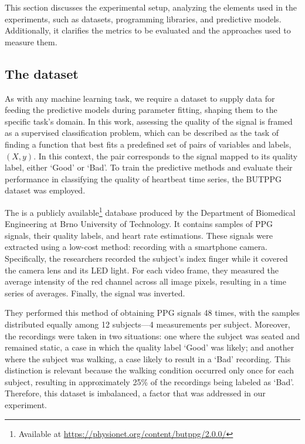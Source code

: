 This section discusses the experimental setup, analyzing the elements used in the experiments, such as datasets, programming libraries, and predictive models. Additionally, it clarifies the metrics to be evaluated and the approaches used to measure them.

\subsection{The dataset}

As with any machine learning task, we require a dataset to supply data for feeding the predictive models during parameter fitting, shaping them to the specific task's domain. In this work, assessing the quality of the signal is framed as a supervised classification problem, which can be described as the task of finding a function that best fits a predefined set of pairs of variables and labels, $(X, y)$. In this context, the pair corresponds to the signal mapped to its quality label, either `Good' or `Bad'. To train the predictive methods and evaluate their performance in classifying the quality of heartbeat time series, the \gls{BUTPPG}~\cite{butppg} dataset was employed.

%

The  is a publicly available\footnote{Available at \url{https://physionet.org/content/butppg/2.0.0/}} database produced by the Department of Biomedical Engineering at Brno University of Technology. It contains samples of \gls{PPG} signals, their quality labels, and heart rate estimations. These signals were extracted using a low-cost method: recording with a smartphone camera. Specifically, the researchers recorded the subject's index finger while it covered the camera lens and its \gls{LED} light. For each video frame, they measured the average intensity of the red channel across all image pixels, resulting in a time series of averages. Finally, the signal was inverted. %

They performed this method of obtaining \gls{PPG} signals 48 times, with the samples distributed equally among 12 subjects—4 measurements per subject. Moreover, the recordings were taken in two situations: one where the subject was seated and remained static, a case in which the quality label `Good' was likely; and another where the subject was walking, a case likely to result in a `Bad' recording. This distinction is relevant because the walking condition occurred only once for each subject, resulting in approximately 25\% of the recordings being labeled as `Bad'. Therefore, this dataset is imbalanced, a factor that was addressed in our experiment.

